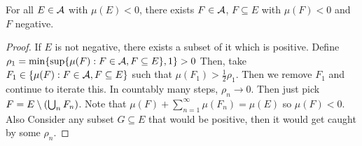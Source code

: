 \begin{theorem}
    For all $E \in \mathcal{A}$ with $\mu(E) < 0$,
    there exists $F \in \mathcal{A}$, $F \subseteq E$ with $\mu(F) < 0$
    and $F$ negative.
    \begin{proof}
        If $E$ is not negative, there exists a subset of it which is positive.
        Define $\rho_1 = \min\{\sup\{\mu(F): F \in \mathcal{A}, F \subseteq E\}, 1\} > 0$
        Then, take $F_1 \in \{\mu(F): F \in \mathcal{A}, F \subseteq E\}$ such that $\mu(F_1) > \frac{1}{2} \rho_1$.
        Then we remove $F_1$ and continue to iterate this. In countably many steps, $\rho_n \to 0$.
        Then just pick $F = E \setminus \qty(\bigcup_{n} F_n)$. Note that
        $\mu(F) + \sum_{n = 1}^{\infty} \mu(F_n) = \mu(E)$ so $\mu(F) < 0$. Also
        Consider any subset $G \subseteq E$ that would be positive, then it would get caught by some $\rho_n$.
    \end{proof}
\end{theorem}

